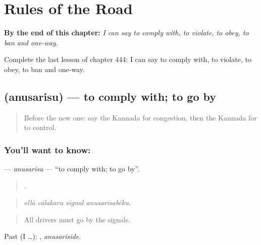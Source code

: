 
\chapter{Rules of the Road}
\label{ch:ka-rules-of-the-road}

\begin{chapteropening}
\textbf{By the end of this chapter:} \emph{I can say to comply with, to violate, to obey, to ban and one-way.}

Complete the last lesson of chapter 444: I can say to comply with, to violate, to obey, to ban and one-way.
\end{chapteropening}

\section[\texorpdfstring{\kn{ಅನುಸರಿಸು} (anusarisu)}{ಅನುಸರಿಸು (anusarisu)}]{ (anusarisu) — to comply with; to go by}

\label{lesson:KA-C444-anusarisu}



\begin{quote}
Before the new one: say the Kannada for congestion, then the Kannada for to control.
\end{quote}

\subsection*{You'll want to know: }
\textbf{} — \emph{anusarisu} — \textquotedblleft{}to comply with; to go by\textquotedblright{}.

\begin{quote}
   .
\end{quote}

\begin{quote}
\emph{ellā cālakaru signal anusarisabēku.}
\end{quote}

\begin{quote}
All drivers must go by the signals.
\end{quote}

Past (I …): , \emph{anusariside}.

